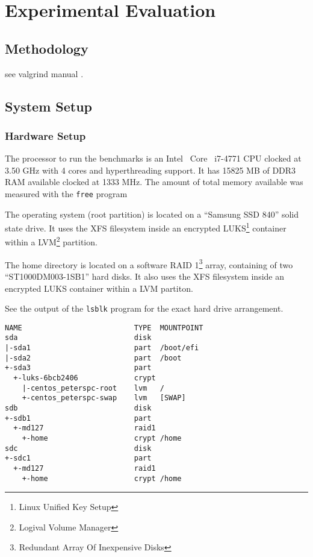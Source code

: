\chapter{Experimental Evaluation}

\section{Methodology}



see valgrind manual \cite{valgrind}.

\section{System Setup}
  \subsection{Hardware Setup}

The processor to run the benchmarks is an Intel\textregistered~ Core\texttrademark~ i7-4771 CPU clocked at 3.50 GHz with 4 cores and hyperthreading support.
It has 15825 MB of DDR3 RAM available clocked at 1333 MHz.
The amount of total memory available was measured with the \texttt{free} program

The operating system (root partition) is located on a ``Samsung SSD 840'' solid state drive.
It uses the XFS filesystem inside an encrypted LUKS\footnote{Linux Unified Key Setup} container within a LVM\footnote{Logival Volume Manager} partition.

The home directory is located on a software RAID 1\footnote{Redundant Array Of Inexpensive Disks} array, containing of two ``ST1000DM003-1SB1'' hard disks.
It also uses the XFS filesystem inside an encrypted LUKS container within a LVM partiton.

See the output of the \texttt{lsblk} program for the exact hard drive arrangement.

\begin{lstlisting}[caption={Disk arrangement on the benchmark machine}]
NAME                          TYPE  MOUNTPOINT
sda                           disk
|-sda1                        part  /boot/efi
|-sda2                        part  /boot
+-sda3                        part
  +-luks-6bcb2406             crypt
    |-centos_peterspc-root    lvm   /
    +-centos_peterspc-swap    lvm   [SWAP]
sdb                           disk
+-sdb1                        part
  +-md127                     raid1
    +-home                    crypt /home
sdc                           disk
+-sdc1                        part
  +-md127                     raid1
    +-home                    crypt /home
\end{lstlisting}

